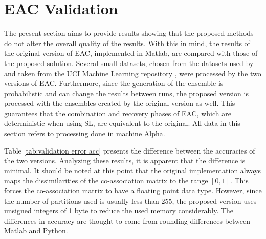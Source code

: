 \section{EAC Validation}
\label{sec:eac validation}

The present section aims to provide results showing that the proposed methods do not alter the overall quality of the results.
With this in mind, the results of the original version of EAC, implemented in Matlab, are compared with those of the proposed solution.
Several small datasets, chosen from the datasets used by \citet{Lourenco2010} and taken from the UCI Machine Learning repository \cite{Lichman:2013}, were processed by the two versions of EAC.
Furthermore, since the generation of the ensemble is probabilistic and can change the results between runs, the proposed version is processed with the ensembles created by the original version as well.
This guarantees that the combination and recovery phases of EAC, which are deterministic when using SL, are equivalent to the original.
All data in this section refers to processing done in machine Alpha.

Table \ref{tab:validation error acc} presents the difference between the accuracies of the two versions.
Analyzing these results, it is apparent that the difference is minimal.
It should be noted at this point that the original implementation always maps the dissimilarities of the co-association matrix to the range $\left [ 0 , 1 \right ]$.
This forces the co-association matrix to have a floating point data type.
However, since the number of partitions used is usually less than 255, the proposed version uses unsigned integers of 1 byte to reduce the used memory considerably.
The differences in accuracy are thought to come from rounding differences between Matlab and Python.

